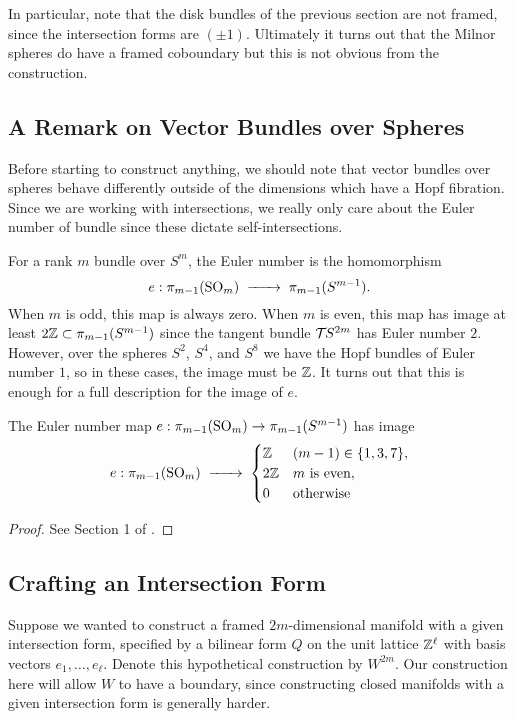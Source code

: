 In particular, note that the disk bundles of the previous section are not framed, since the intersection forms are $(\pm 1)$. Ultimately it turns out that the Milnor spheres do have a framed coboundary but this is not obvious from the construction.

\subsection{A Remark on Vector Bundles over Spheres}

Before starting to construct anything, we should note that vector bundles over spheres behave differently outside of the dimensions which have a Hopf fibration. Since we are working with intersections, we really only care about the Euler number of bundle since these dictate self-intersections.

For a rank $m$ bundle over $S^m$, the Euler number is the homomorphism
\[
	e : \pi_{m-1}(\SO_m) \lkxto \pi_{m-1}(S^{m-1}).
\]
When $m$ is odd, this map is always zero. When $m$ is even, this map has image at least $2\mathbb{Z}\subset \pi_{m-1}(S^{m-1})$ since the tangent bundle ${\mathcal{T}\hspace{-0.1em}} S^{2m}$ has Euler number $2$. However, over the spheres $S^2$, $S^4$, and $S^8$ we have the Hopf bundles of Euler number $1$, so in these cases, the image must be $\mathbb{Z}$. It turns out that this is enough for a full description for the image of $e$.

\begin{proposition}\label{thm:possible-euler-numbers-over-spheres}
	The Euler number map $e : \pi_{m-1}(\mathrm{SO}_m) \to \pi_{m-1}(S^{m-1})$ has image
	\[
		e : \pi_{m-1}(\SO_m) \lkxto
		\begin{cases}
			\Z  & (m-1)\in\{1,3,7\},  \\
			2\Z & m\textrm{ is even}, \\
			0   & \textrm{otherwise}\end{cases}
	\]
\end{proposition}
\begin{proof}
	See Section 1 of \cite{levine1985lectures}.
\end{proof}

\subsection{Crafting an Intersection Form}

Suppose we wanted to construct a framed $2m$-dimensional manifold with a given intersection form, specified by a bilinear form $Q$ on the unit lattice $\mathbb{Z}^\ell$ with basis vectors $e_1,\ldots, e_\ell$. Denote this hypothetical construction by $W^{2m}$. Our construction here will allow $W$ to have a boundary, since constructing closed manifolds with a given intersection form is generally harder.

